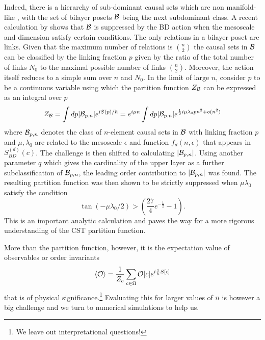 Indeed, there is a hierarchy of sub-dominant causal sets which are  non manifold-like \citep{dharone,dhartwo,kr,pst}, with the
set of bilayer posets $\mathcal B$ being the next  subdominant class.
A recent  calculation  by  \cite{carliploomis} shows that $\mathcal B$  is suppressed by the
BD action when the mesoscale and dimension satisfy certain conditions. The only relations  in a bilayer poset are
links. Given that the maximum number of relations is $\binom{n}{2}$ the causal sets in $\mathcal B$ can be   classified  by the
linking fraction $p$ given by the ratio of the total number of  links $N_0$ to the maximal possible number of links
$\binom{n}{2}$. Moreover, the action itself reduces to a simple sum over $n$ and $N_0$.  
In the limit of large $n$, \cite{carliploomis} consider $p$ to be a continuous variable using which the partition
function $Z_{\mathcal B}$ can be expressed as an integral over $p$ 
\begin{equation} 
Z_{\mathcal B}= \int d p|\mathcal B_{p,n}|e^{iS(p)/\hbar}  = e^{i\mu n} \int dp|\mathcal B_{p,n}| e^{\frac{1}{2}i \mu \lambda_0 p n^2 +o(n^2)}  
\end{equation} 
where  $\mathcal B_{p,n}$ denotes the  class of $n$-element  causal sets in $\mathcal B$ with linking fraction $p$ and $\mu,
\lambda_0$ are related to the mesoscale $\epsilon$ and  function $f_d(n,\epsilon)$ that appears in $S_{BD}^{(d)}(c)$. The
challenge is then shifted to  calculating  $|\mathcal B_{p,n}|$. Using another parameter $q$ which gives the cardinality of the upper layer as a further subclassification of $\mathcal B_{p,n}$, the leading order contribution to $|\mathcal B_{p,n}|$ was found. The resulting partition function was then shown to be strictly suppressed when $\mu \lambda_0$  satisfy the condition
\begin{equation}
\tan(-\mu\lambda_0/2) > \left(\frac{27}{4} e^{-\frac{1}{2}} -1 \right).  
\end{equation} 
This is an important analytic calculation and paves the way for a more rigorous understanding of the CST partition
function. 

More than the partition function, however,  it is the expectation value of observables or order invariants   
\begin{equation}
\langle {\mathcal O} \rangle = \frac{1}{Z_c} \sum_{c \in \Omega} \mathcal O[c] e^{i \frac{1}{h} S[c]} 
\end{equation}
that is of physical significance.\footnote{We leave out interpretational questions!}  Evaluating this for larger values of $n$  is however a big challenge and we turn to numerical simulations to help us.

